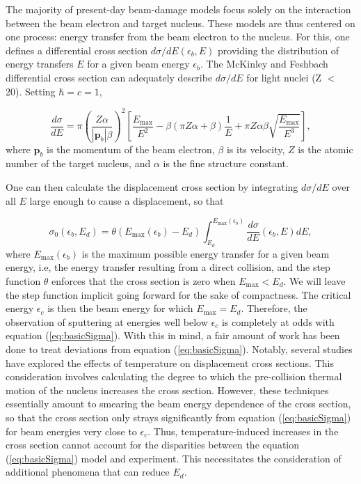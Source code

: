 \documentclass[twoside,twocolumn,9pt]{article}
\begin{document}
The majority of present-day beam-damage models focus solely on the interaction
between the beam electron and target nucleus.
These models are thus centered on one process: energy transfer from the beam
electron to the nucleus.
For this, one defines a differential cross section $d\sigma/dE(\epsilon_b, E)$
providing the distribution of energy transfers $E$ for a given beam energy
$\epsilon_b$.
The McKinley and Feshbach differential cross section can adequately describe
$d\sigma/dE$
for light nuclei (Z $<$ 20).\cite{Mott1929, McKinley1948, Oen1973,
Egerton2010}  Setting $\hbar = c = 1$,

\begin{equation}
  \frac{d\sigma}{dE}
  =
  \pi\left(\frac{Z\alpha}{|\mathbf{p}_b|\beta}\right)^2
  \left[
    \frac{E_\text{max}}{E^2}
    - \beta(\pi Z\alpha+\beta)\frac{1}{E}
    + \pi Z\alpha\beta\sqrt{\frac{E_\text{max}}{E^3}}
  \right],
  \label{eq:MF}
\end{equation}
%
where $\mathbf{p}_b$ is the momentum of the beam electron, $\beta$ is its
velocity, $Z$ is the atomic number of the target nucleus, and $\alpha$ is the
fine structure constant.

One can then calculate the displacement cross section by integrating
$d\sigma/dE$ over all $E$ large enough to cause a displacement, so that

\begin{equation}
  \sigma_0(\epsilon_b, {E}_d)
  =
  \theta(E_\text{max}(\epsilon_b) - E_d)
  \int_{E_d}^{E_\text{max}(\epsilon_b)}
  \frac{d\sigma}{dE}(\epsilon_b, E)
  dE,
  \label{eq:basicSigma}
\end{equation}
%
where $E_\text{max}(\epsilon_b)$
is the maximum possible energy transfer for a given beam energy, i.e, the
energy transfer resulting from a direct collision, and the step function
$\theta$ enforces that the cross section is zero when $E_\text{max} < E_d$.
We will leave the step function implicit going forward for the sake of
compactness.
The critical energy $\epsilon_c$ is then the beam energy for which
$E_\text{max}=E_d$.
Therefore, the observation of sputtering at energies well below $\epsilon_c$ is
completely at odds with equation (\ref{eq:basicSigma}).
With this in mind, a fair amount of work has been done to treat deviations from
equation (\ref{eq:basicSigma}).
Notably, several studies have explored the effects of temperature on
displacement cross sections. \cite{Meyer2012,Susi2016,Yoshimura2018}
This consideration involves calculating the degree to which the pre-collision
thermal motion of the nucleus increases the cross section.
However, these techniques essentially amount to smearing the beam energy
dependence of the cross section, so that the cross section only strays
significantly from equation (\ref{eq:basicSigma}) for beam energies very close
to $\epsilon_c$.
Thus, temperature-induced increases in the cross section cannot account for the
disparities between the equation (\ref{eq:basicSigma}) model and
experiment.
This necessitates the consideration of additional phenomena that can reduce
$E_d$.
\end{document}
